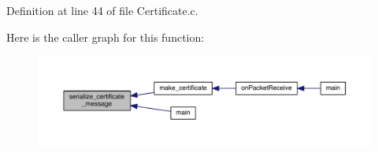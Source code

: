 Definition at line 44 of file Certificate.\+c.



Here is the caller graph for this function\+:\nopagebreak
\begin{figure}[H]
\begin{center}
\leavevmode
\includegraphics[width=350pt]{_certificate_8h_aa9ddf572a9591ebeea6976eb73166969_icgraph}
\end{center}
\end{figure}


